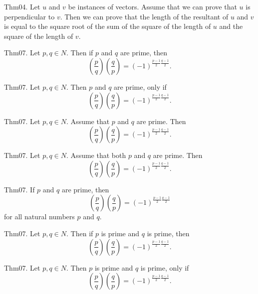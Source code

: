 \documentclass{article}
\begin{document}
Thm04. Let $u$ and $v$ be instances of vectors. Assume that we can prove that $u$ is perpendicular to $v$. Then we can prove that the length of the resultant of $u$ and $v$ is equal to the square root of the sum of the square of the length of $u$ and the square of the length of $v$.

Thm07. Let $p , q \in N$. Then if $p$ and $q$ are prime, then $$\left(\frac{ p }{ q }\right) \left(\frac{ q }{ p }\right) = (- 1)^ {\frac{ p - 1}{2}\frac{ q - 1}{2}}.$$

Thm07. Let $p , q \in N$. Then $p$ and $q$ are prime, only if $$\left(\frac{ p }{ q }\right) \left(\frac{ q }{ p }\right) = (- 1)^ {\frac{ p - 1}{2}\frac{ q - 1}{2}}.$$

Thm07. Let $p , q \in N$. Assume that $p$ and $q$ are prime. Then $$\left(\frac{ p }{ q }\right) \left(\frac{ q }{ p }\right) = (- 1)^ {\frac{ p - 1}{2}\frac{ q - 1}{2}}.$$

Thm07. Let $p , q \in N$. Assume that both $p$ and $q$ are prime. Then $$\left(\frac{ p }{ q }\right) \left(\frac{ q }{ p }\right) = (- 1)^ {\frac{ p - 1}{2}\frac{ q - 1}{2}}.$$

Thm07. If $p$ and $q$ are prime, then $$\left(\frac{ p }{ q }\right) \left(\frac{ q }{ p }\right) = (- 1)^ {\frac{ p - 1}{2}\frac{ q - 1}{2}}$$ for all natural numbers $p$ and $q$.

Thm07. Let $p , q \in N$. Then if $p$ is prime and $q$ is prime, then $$\left(\frac{ p }{ q }\right) \left(\frac{ q }{ p }\right) = (- 1)^ {\frac{ p - 1}{2}\frac{ q - 1}{2}}.$$

Thm07. Let $p , q \in N$. Then $p$ is prime and $q$ is prime, only if $$\left(\frac{ p }{ q }\right) \left(\frac{ q }{ p }\right) = (- 1)^ {\frac{ p - 1}{2}\frac{ q - 1}{2}}.$$
\end{document}

